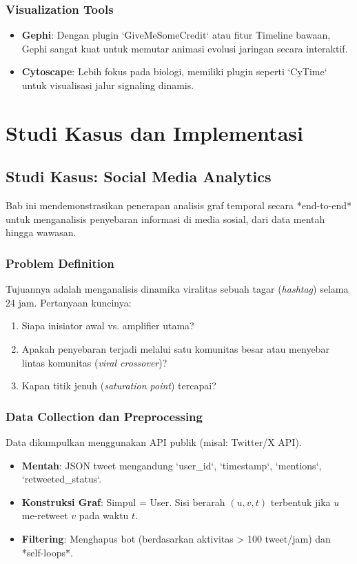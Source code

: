 \documentclass[12pt,a4paper]{book}
\begin{document}
\section{Visualization Tools}
\begin{itemize}
    \item \textbf{Gephi}: Dengan plugin `GiveMeSomeCredit` atau fitur Timeline bawaan, Gephi sangat kuat untuk memutar animasi evolusi jaringan secara interaktif.
    \item \textbf{Cytoscape}: Lebih fokus pada biologi, memiliki plugin seperti `CyTime` untuk visualisasi jalur signaling dinamis.
\end{itemize}

\part{Studi Kasus dan Implementasi}

\chapter{Studi Kasus: Social Media Analytics}
Bab ini mendemonstrasikan penerapan analisis graf temporal secara *end-to-end* untuk menganalisis penyebaran informasi di media sosial, dari data mentah hingga wawasan.

\section{Problem Definition}
Tujuannya adalah menganalisis dinamika viralitas sebuah tagar (\textit{hashtag}) selama 24 jam. Pertanyaan kuncinya:
\begin{enumerate}
    \item Siapa inisiator awal vs. amplifier utama?
    \item Apakah penyebaran terjadi melalui satu komunitas besar atau menyebar lintas komunitas (\textit{viral crossover})?
    \item Kapan titik jenuh (\textit{saturation point}) tercapai?
\end{enumerate}

\section{Data Collection dan Preprocessing}
Data dikumpulkan menggunakan API publik (misal: Twitter/X API).
\begin{itemize}
    \item \textbf{Mentah}: JSON tweet mengandung `user_id`, `timestamp`, `mentions`, `retweeted_status`.
    \item \textbf{Konstruksi Graf}: Simpul = User. Sisi berarah $(u, v, t)$ terbentuk jika $u$ me-retweet $v$ pada waktu $t$.
    \item \textbf{Filtering}: Menghapus bot (berdasarkan aktivitas > 100 tweet/jam) dan *self-loops*.
\end{itemize}
\end{document}
